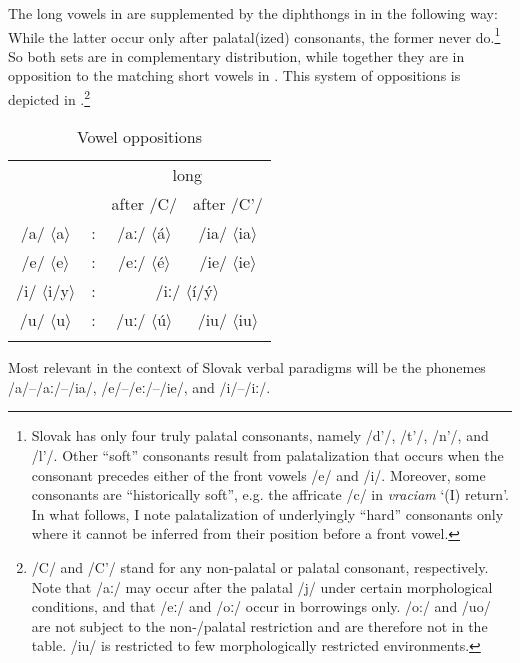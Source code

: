\documentclass[output=paper,colorlinks,citecolor=brown,
]{langscibook}
\begin{document}
\noindent The long vowels in  are supplemented by the diphthongs in  in the following way: While the latter occur only after palatal(ized) consonants, the former never do.\footnote{Slovak has only four truly palatal consonants, namely /d'/, /t'/, /n'/, and /l'/. Other ``soft'' consonants result from palatalization that occurs when the consonant precedes either of the front vowels /e/ and /i/. Moreover, some consonants are ``historically soft'', e.g. the affricate /c/ in \textit{vraciam} `(I) return'. In what follows, I note palatalization of underlyingly ``hard'' consonants only where it cannot be inferred from their position before a front vowel.} So both sets are in complementary distribution, while together they are in opposition to the matching short vowels in . This system of oppositions is depicted in .\footnote{/C/ and /C'/ stand for any non-palatal or palatal consonant, respectively. Note that /aː/ may occur after the palatal /j/ under certain morphological conditions, and that /eː/ and /oː/ occur in borrowings only. /o:/ and /uo/ are not subject to the non-/palatal restriction and are therefore not in the table. /iu/ is restricted to few morphologically restricted environments.}


\begin{table}
\caption{Vowel oppositions}
\label{tab:pitsch:5}
 \begin{tabular}{cccc}
  \lsptoprule
  \multirow{2}{*}{short} & & \multicolumn{2}{c}{long} \\
  & & after /C/ & after /C'/ \\
  \midrule
  /a/ $\langle$a$\rangle$ & : & /aː/ $\langle$á$\rangle$ & /ia/ $\langle$ia$\rangle$ \\
  /e/ $\langle$e$\rangle$ & : & /eː/ $\langle$é$\rangle$ & /ie/ $\langle$ie$\rangle$ \\
  /i/ $\langle$i/y$\rangle$ & : & \multicolumn{2}{c}{/iː/ $\langle$í/ý$\rangle$} \\
  /u/ $\langle$u$\rangle$ & : & /uː/ $\langle$ú$\rangle$ & /iu/ $\langle$iu$\rangle$ \\
  \lspbottomrule
 \end{tabular}
\end{table}

Most relevant in the context of Slovak verbal paradigms will be the phonemes  /a/--/aː/--/ia/, /e/--/eː/--/ie/, and /i/--/iː/.
\end{document}
